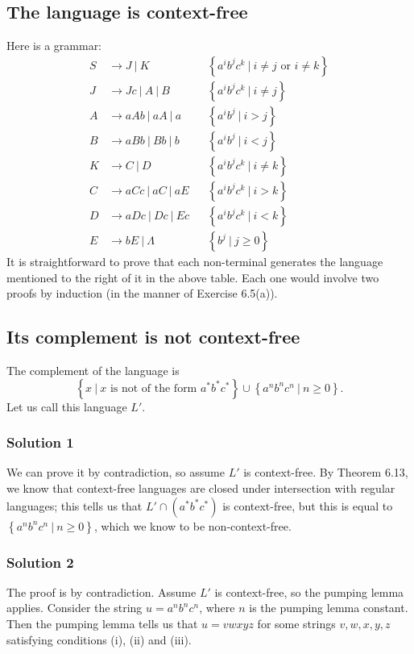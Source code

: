 \documentclass[12pt]{article}
\newcommand{\alt}{\ |\ }
\newcommand{\set}[1]{\left\{#1\right\}}
\newcommand{\Set}[2]{\set{#1\ |\ #2}}
\begin{document}
  \subsection{The language is context-free}
    Here is a grammar:
    \begin{align*}
      S &\to J \alt K && \Set{a^ib^jc^k}{\text{$i\neq j$ or $i\neq k$}} \\
      J &\to Jc \alt A \alt B && \Set{a^ib^jc^k}{i\neq j} \\
      A &\to aAb \alt aA \alt a && \Set{a^ib^j}{i>j} \\
      B &\to aBb \alt Bb \alt b && \Set{a^ib^j}{i<j} \\
      K &\to C \alt D && \Set{a^ib^jc^k}{i\neq k} \\
      C &\to aCc \alt aC \alt aE && \Set{a^ib^jc^k}{i>k} \\
      D &\to aDc \alt Dc \alt Ec && \Set{a^ib^jc^k}{i<k} \\
      E &\to bE \alt \Lambda && \Set{b^j}{j\geq0}
    \end{align*}
    It is straightforward to prove that each non-terminal generates the language mentioned to the right of it in the above table. Each one would involve two proofs by induction (in the manner of Exercise 6.5(a)).
  \subsection{Its complement is not context-free}
    The complement of the language is
    \[
      \Set{x}{\text{$x$ is not of the form $a^*b^*c^*$}} \cup \Set{a^nb^nc^n}{n\geq0}.
    \]
    Let us call this language $L'$.
    \subsubsection{Solution 1}
      We can prove it by contradiction, so assume $L'$ is context-free. By Theorem 6.13, we know that context-free languages are closed under intersection with regular languages; this tells us that $L'\cap(a^*b^*c^*)$ is context-free, but this is equal to $\Set{a^nb^nc^n}{n\geq0}$, which we know to be non-context-free.
    \subsubsection{Solution 2}
      The proof is by contradiction. Assume $L'$ is context-free, so the pumping lemma applies. Consider the string $u=a^nb^nc^n$, where $n$ is the pumping lemma constant. Then the pumping lemma tells us that $u=vwxyz$ for some strings $v,w,x,y,z$ satisfying conditions (i), (ii) and (iii).
\end{document}
